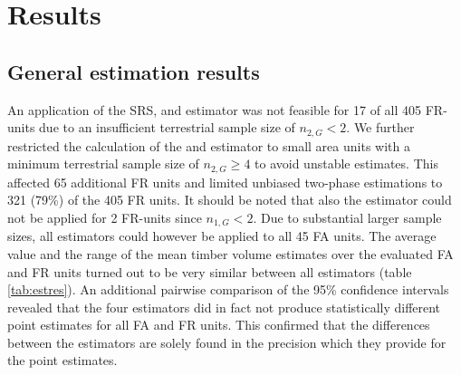 \section{Results}
\label{sec:Res}

\subsection{General estimation results}
\label{sec:feasest}

An application of the SRS, \psmall{} and \extpsynth{} estimator was not feasible for 17 of all 405 FR-units due to an insufficient terrestrial sample size of $n_{2,G} < 2$. We further restricted the calculation of the \psmall{} and \extpsynth{} estimator to small area units with a minimum terrestrial sample size of $n_{2,G} \geq 4$ to avoid unstable estimates. This affected 65 additional FR units and limited unbiased two-phase estimations to 321 (79\%) of the 405 FR units. It should be noted that also the \psynth{} estimator could not be applied for 2 FR-units since $n_{1,G} < 2$. Due to substantial larger sample sizes, all estimators could however be applied to all 45 FA units. The average value and the range of the mean timber volume estimates over the evaluated FA and FR units turned out to be very similar between all estimators (table \ref{tab:estres}). An additional pairwise comparison of the 95\% confidence intervals revealed that the four estimators did in fact not produce statistically different point estimates for all FA and FR units. This confirmed that the differences between the estimators are solely found in the precision which they provide for the point estimates.


%
% 

